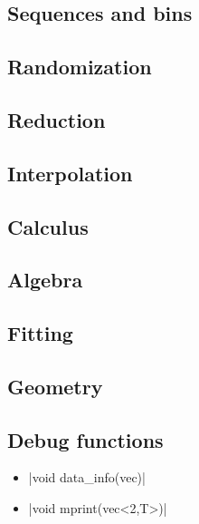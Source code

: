 \subsection{Sequences and bins \label{SEC:support:math:sequence}}


\subsection{Randomization \label{SEC:support:math:random}}


\subsection{Reduction \label{SEC:support:math:reduce}}


\subsection{Interpolation \label{SEC:support:math:interp}}


\subsection{Calculus \label{SEC:support:math:calculus}}


\subsection{Algebra \label{SEC:support:math:algebra}}


\subsection{Fitting \label{SEC:support:math:fit}}


\subsection{Geometry \label{SEC:support:math:geometry}}


\subsection{Debug functions \label{SEC:support:math:debug}}

\begin{itemize}
\item \cppinline|void data_info(vec)| 
\item \cppinline|void mprint(vec<2,T>)| 
\end{itemize}
